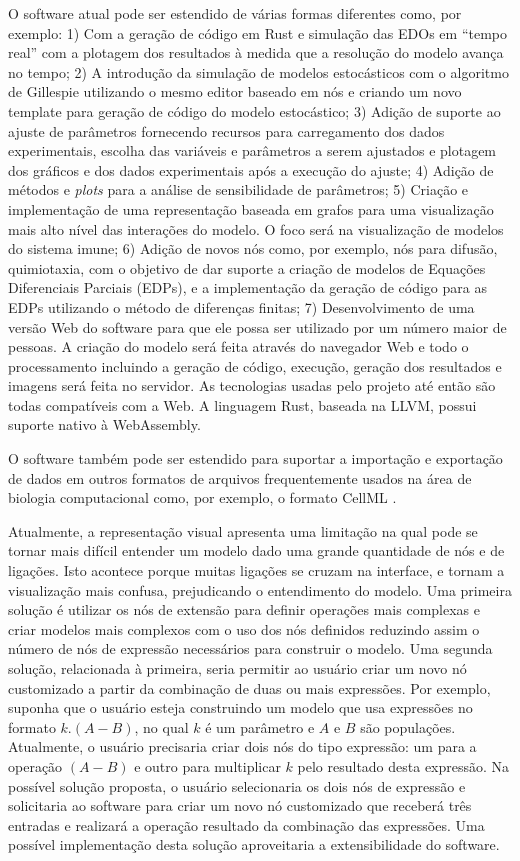 \documentclass[
	12pt,				%
	openright,			%
	oneside,			%
	a4paper,			%
	main=brazil,
	english,			%
	]{ufsj-abntex2}
\begin{document}
O software atual pode ser estendido de várias formas diferentes como, por exemplo: 1) Com a geração de código em Rust e simulação das EDOs em ``tempo real'' com a plotagem dos resultados à medida que a resolução do modelo avança no tempo; 2) A introdução da simulação de modelos estocásticos com o algoritmo de Gillespie utilizando o mesmo editor baseado em nós e criando um novo template para geração de código do modelo estocástico; 3) Adição de suporte ao ajuste de parâmetros fornecendo recursos para carregamento dos dados experimentais, escolha das variáveis e parâmetros a serem ajustados e plotagem dos gráficos e dos dados experimentais após a execução do ajuste; 4) Adição de métodos e \textit{plots} para a análise de sensibilidade de parâmetros; 5) Criação e implementação de uma representação baseada em grafos para uma visualização mais alto nível das interações do modelo. O foco será na visualização de modelos do sistema imune; 6) Adição de novos nós como, por exemplo, nós para difusão, quimiotaxia, com o objetivo de dar suporte a criação de modelos de Equações Diferenciais Parciais (EDPs), e a implementação da geração de código para as EDPs utilizando o método de diferenças finitas; 7) Desenvolvimento de uma versão Web do software para que ele possa ser utilizado por um número maior de pessoas. A criação do modelo será feita através do navegador Web e todo o processamento incluindo a geração de código, execução, geração dos resultados e imagens será feita no servidor. As tecnologias usadas pelo projeto até então são todas compatíveis com a Web. A linguagem Rust, baseada na LLVM, possui suporte nativo à WebAssembly.

O software também pode ser estendido para suportar a importação e exportação de dados em outros formatos de arquivos frequentemente usados na área de biologia computacional como, por exemplo, o formato CellML \cite{CUELLAR2003451}. 

Atualmente, a representação visual apresenta uma limitação na qual pode se tornar mais difícil entender um modelo dado uma grande quantidade de nós e de ligações. Isto acontece porque muitas ligações se cruzam na interface, e tornam a visualização mais confusa, prejudicando o entendimento do modelo. Uma primeira solução é utilizar os nós de extensão para definir operações mais complexas e criar modelos mais complexos com o uso dos nós definidos reduzindo assim o número de nós de expressão necessários para construir o modelo. Uma segunda solução, relacionada à primeira, seria permitir ao usuário criar um novo nó customizado a partir da combinação de duas ou mais expressões. Por exemplo, suponha que o usuário esteja construindo um modelo que usa expressões no formato $k.(A - B)$, no qual $k$ é um parâmetro e $A$ e $B$ são populações. Atualmente, o usuário precisaria criar dois nós do tipo expressão: um para a operação $(A - B)$ e outro para multiplicar $k$ pelo resultado desta expressão. Na possível solução proposta, o usuário selecionaria os dois nós de expressão e solicitaria ao software para criar um novo nó customizado que receberá três entradas e realizará a operação resultado da combinação das expressões. Uma possível implementação desta solução aproveitaria a extensibilidade do software.
\end{document}

